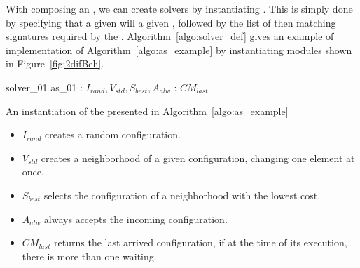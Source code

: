 

With \bothmodules{} composing an \as, we can create solvers by instantiating \ms. This is simply done by specifying that a given \mbox{} will \mbox{} a given \as, followed by the list of \omprefix{} then \opchs{} matching signatures required by the \as. Algorithm~\ref{algo:solver_def} gives an example of implementation of Algorithm~\ref{algo:as_example} by instantiating modules shown in Figure~\ref{fig:2difBeh}.

\begin{algorithm}[H]
\dontprintsemicolon
\SetNoline
{}
 solver\_01  as\_01\;
 : $I_{rand}, V_{std}, S_{best}, A_{alw}$ \; 
: $CM_{last}$\; %
\caption{An instantiation of the \as{} presented in Algorithm~\ref{algo:as_example}}\label{algo:solver_def}
\end{algorithm}

\begin{itemize}
\item $I_{rand}$ creates a random configuration.
\item $V_{std}$ creates a neighborhood of a given configuration, changing one element at once.
\item $S_{best}$ selects the configuration of a neighborhood with the lowest cost.
\item $A_{alw}$ always accepts the incoming configuration.
\item $CM_{last}$ returns the last arrived configuration, if at the time of its execution, there is more than one waiting. 
\end{itemize}